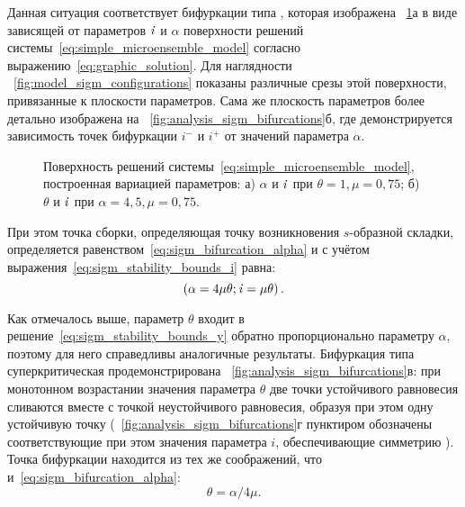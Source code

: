 Данная ситуация соответствует бифуркации типа , которая изображена \onfigure~\ref{fig:analysis_sigm_solution_surface}а в виде зависящей от параметров $\mathit{i}$ и $\alpha$ поверхности решений системы~\eqref{eq:simple_microensemble_model} согласно выражению~\eqref{eq:graphic_solution}. Для наглядности \onfigure~\ref{fig:model_sigm_configurations} показаны различные срезы этой поверхности, привязанные к плоскости параметров. Сама же плоскость параметров более детально изображена на \onfigure~\ref{fig:analysis_sigm_bifurcations}б, где демонстрируется зависимость точек бифуркации $i^{-}$ и $i^{+}$ от значений параметра $\alpha$. 
\begin{figure}[ht]
    \caption{Поверхность решений системы~\eqref{eq:simple_microensemble_model}, построенная вариацией параметров: а) $\alpha$ и $\mathit{i}$ при $\theta = 1, \mu = 0,75$; б) $\theta$ и $\mathit{i}$ при $\alpha = 4,5, \mu = 0,75$.}
    \label{fig:analysis_sigm_solution_surface}
\end{figure}
При этом \socalled точка сборки, определяющая точку возникновения $s$-образной складки, определяется равенством~\eqref{eq:sigm_bifurcation_alpha} и с учётом выражения~\eqref{eq:sigm_stability_bounds_i} равна:
\begin{equation}
    \nonumber
    \left(\alpha = 4 \mu \theta; \mathit{i} = \mu \theta\right).
\end{equation}

Как отмечалось выше, параметр $\theta$ входит в решение~\eqref{eq:sigm_stability_bounds_y} обратно пропорционально параметру $\alpha$, поэтому для него справедливы аналогичные результаты. Бифуркация типа суперкритическая  продемонстрирована \onfigure~\ref{fig:analysis_sigm_bifurcations}в: при монотонном возрастании значения параметра $\theta$ две точки устойчивого равновесия сливаются вместе с точкой неустойчивого равновесия, образуя при этом одну устойчивую точку (\onfigure~\ref{fig:analysis_sigm_bifurcations}г пунктиром обозначены соответствующие при этом значения параметра $i$, обеспечивающие симметрию ). Точка бифуркации находится из тех же соображений, что и~\eqref{eq:sigm_bifurcation_alpha}:
\begin{equation}
    \label{eq:sigm_bifurcation_theta}
    \theta =  \alpha / 4 \mu.
\end{equation}

